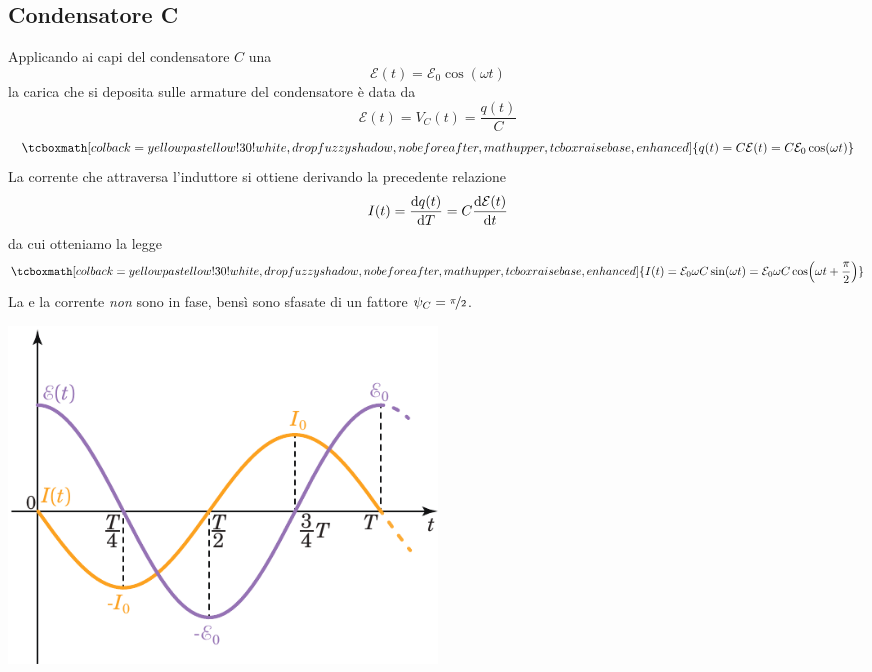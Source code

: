 \subsection{Condensatore C}
	\begin{center}		
\end{center}
Applicando ai capi del condensatore $C$ una \fem
\begin{equation*}
	\mathcal{E}(t)=\mathcal{E}_0\cos(\omega t)
\end{equation*}
la carica che si deposita sulle armature del condensatore è data da
\begin{equation*}
	\mathcal{E}(t)=V_C(t)=\frac{q(t)}{C}
\end{equation*}
\begin{equation}
		\tcboxmath[colback=yellowpastellow!30!white,drop fuzzy shadow, nobeforeafter, math upper, tcbox raise base, enhanced]{q(t)=C\mathcal{E}(t)=C\mathcal{E}_0\cos(\omega t)}
\end{equation}
La corrente che attraversa l'induttore si ottiene derivando la precedente relazione
\begin{equation*}
	I(t)=\dv{q(t)}{T}=C\dv{\mathcal{E}(t)}{t}\\
\end{equation*}
da cui otteniamo la legge
\begin{equation}
		\tcboxmath[colback=yellowpastellow!30!white,drop fuzzy shadow, nobeforeafter, math upper, tcbox raise base, enhanced]{I(t)=\mathcal{E}_0\omega C\sin(\omega t)=\mathcal{E}_0\omega C\cos(\omega t+\frac{\pi}{2})}
\end{equation}
La \fem e la corrente \textit{non} sono in fase, bensì sono sfasate di un fattore $\psi_C=\nicefrac{\pi}{2}$.
\begin{center}
	\includegraphics[width=0.5\textwidth]{images/chp11/chp11Csymbgraf1.pdf}
\end{center}
